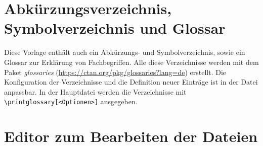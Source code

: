 \section{Abkürzungsverzeichnis, Symbolverzeichnis und Glossar}
Diese Vorlage enthält auch ein Abkürzungs- und Symbolverzeichnis, sowie ein Glossar zur Erklärung von Fachbegriffen. Alle diese Verzeichnisse werden mit dem Paket \textit{glossaries} (\url{https://ctan.org/pkg/glossaries?lang=de}) erstellt. Die Konfiguration der Verzeichnisse und die Definition neuer Einträge ist in der Datei  anpassbar. In der Hauptdatei werden die Verzeichnisse mit \verb|\printglossary[<Optionen>]| ausgegeben.

\section{Editor zum Bearbeiten der Dateien} \label{sec:Editor}